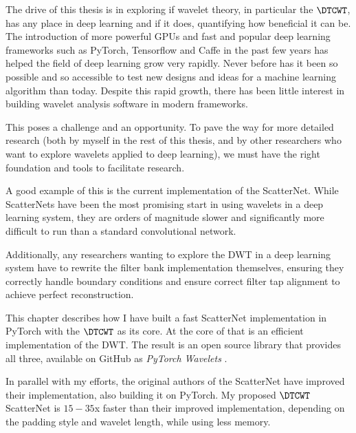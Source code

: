 The drive of this thesis is in exploring if wavelet theory, in
particular the $\DTCWT$, has any place in deep learning and if it does,
quantifying how beneficial it can be. The introduction of more powerful GPUs and
fast and popular deep learning frameworks such as PyTorch, Tensorflow and Caffe
in the past few years has helped the field of deep learning grow very rapidly.
Never before has it been so possible and so accessible to test new designs and
ideas for a machine learning algorithm than today. Despite this rapid growth,
there has been little interest in building wavelet analysis software in modern
frameworks. 

This poses a challenge and an opportunity. To pave the way for more detailed 
research (both by myself in the rest of this thesis, and by other researchers
who want to explore wavelets applied to deep learning), we must have the right
foundation and tools to facilitate research.

A good example of this is the current implementation of the ScatterNet. While
ScatterNets have been the most promising start in using wavelets in a deep
learning system, they are orders of magnitude slower and significantly more
difficult to run than a standard convolutional network. 

Additionally, any researchers wanting to explore the DWT in a deep learning
system have to rewrite the filter bank implementation themselves, ensuring they
correctly handle boundary conditions and ensure correct filter tap alignment to
achieve perfect reconstruction.

This chapter describes how I have built a fast ScatterNet implementation in 
PyTorch with the $\DTCWT$ as its core. At the core of that is an efficient 
implementation of the DWT\@. The result is an open source library that provides
all three, available on GitHub as \emph{PyTorch Wavelets} \cite{}.

In parallel with my efforts, the original authors of the ScatterNet have
improved their implementation, also building it on PyTorch. My proposed
$\DTCWT$ ScatterNet is $15-35$x faster than their improved implementation,
depending on the padding style and wavelet length, while using less memory. 

